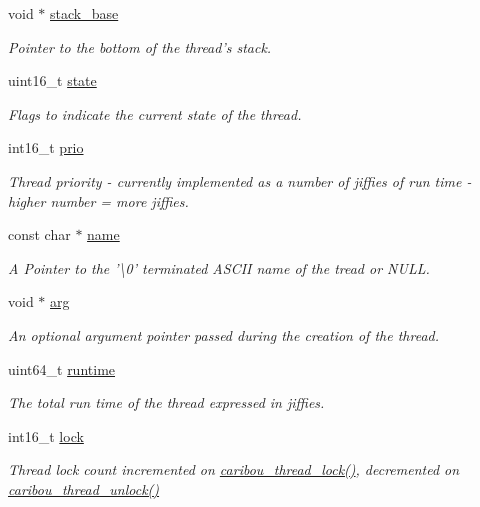 \begin{DoxyCompactItemize}
void $\ast$ \hyperlink{struct__caribou__thread__t_a6e316e784c771be57958edcd9e95b8d9}{stack\-\_\-base}
\begin{DoxyCompactList}\small\item\em Pointer to the bottom of the thread's stack. \end{DoxyCompactList}\item 
uint16\-\_\-t \hyperlink{struct__caribou__thread__t_a9896ce34d6cb9832eca2456d281b2eec}{state}
\begin{DoxyCompactList}\small\item\em Flags to indicate the current state of the thread. \end{DoxyCompactList}\item 
int16\-\_\-t \hyperlink{struct__caribou__thread__t_a91f8936a0a3a5c21c4ffcbe1045c34ee}{prio}
\begin{DoxyCompactList}\small\item\em Thread priority -\/ currently implemented as a number of jiffies of run time -\/ higher number = more jiffies. \end{DoxyCompactList}\item 
const char $\ast$ \hyperlink{struct__caribou__thread__t_af6982a95fce8e2c99023a803d903707b}{name}
\begin{DoxyCompactList}\small\item\em A Pointer to the '\textbackslash{}0' terminated A\-S\-C\-I\-I name of the tread or N\-U\-L\-L. \end{DoxyCompactList}\item 
void $\ast$ \hyperlink{struct__caribou__thread__t_a35f2bbe0ed40746c1505382dbb5cd865}{arg}
\begin{DoxyCompactList}\small\item\em An optional argument pointer passed during the creation of the thread. \end{DoxyCompactList}\item 
uint64\-\_\-t \hyperlink{struct__caribou__thread__t_a942c87c4803e79dabc7fd0b5e24afb63}{runtime}
\begin{DoxyCompactList}\small\item\em The total run time of the thread expressed in jiffies. \end{DoxyCompactList}\item 
int16\-\_\-t \hyperlink{struct__caribou__thread__t_a3f291721c2674ea6c5776d014357144b}{lock}
\begin{DoxyCompactList}\small\item\em Thread lock count incremented on \hyperlink{thread_8h_a81ec8b7e5f2accca0c462337830fbdf5}{caribou\-\_\-thread\-\_\-lock()}, decremented on \hyperlink{thread_8h_a0b4d0cd341028e7713f6f0f60a018529}{caribou\-\_\-thread\-\_\-unlock()} \end{DoxyCompactList}\item 

\end{DoxyCompactItemize}
